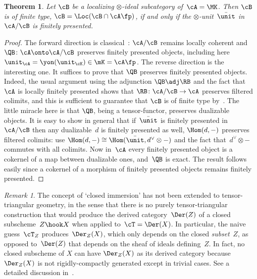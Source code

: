 \documentclass[11pt]{amsart}
\numberwithin{equation}{section} %
\theoremstyle{plain}
\newtheorem{thm}[equation]{Theorem}
\theoremstyle{definition}
\theoremstyle{remark}
\newtheorem{rem}[equation]{Remark}
\begin{document}
%
\begin{thm}
\label{thm:finite-type}%
Let $\cB$ be a localizing $\otimes$-ideal subcategory of~$\cA=\MK$. Then $\cB$ is of finite type, \ie $\cB=\Loc(\cB \cap \cA\fp)$, if and only if the $\otimes$-unit~$\bar\unit$ in~$\cA/\cB$ is finitely presented.
\end{thm}
%
\begin{proof}
The forward direction is classical~\cite[Theorem~2.6]{Krause97}: $\cA/\cB$ remains locally coherent and~$\QB\colon \cA\onto \cA/\cB$ preserves finitely presented objects, including here~$\unit_{\cA}=\yon(\unit_{\cK})\in\mK=\cA\fp$.
The reverse direction is the interesting one. It suffices to prove that $\QB$ preserves finitely presented objects. Indeed, the usual argument using the adjunction $\QB\adj \RB$ and the fact that $\cA$ is locally finitely presented shows that $\RB\colon \cA/\cB\to \cA$ preserves filtered colimits, and this is sufficient to guarantee that $\cB$ is of finite type by~\cite[Lemma~2.4]{Krause97}. The little miracle here is that $\QB$, being a tensor-functor, preserves dualizable objects. It is easy to show in general that if~$\bar\unit$ is finitely presented in~$\cA/\cB$ then any dualizable~$d$ is finitely presented as well, \ie $\Hom(d,-)$ preserves filtered colimits: use $\Hom(d,-)\cong\Hom(\bar\unit,d^\vee\otimes-)$ and  the fact that~$d^\vee\otimes-$ commutes with all colimits. Now in~$\cA$ every finitely presented object is a cokernel of a map between dualizable ones, and~$\QB$ is exact. The result follows easily since a cokernel of a morphism of finitely presented objects remains finitely presented.
\end{proof}

%
\begin{rem}
\label{rem:not-T_Z}%
The concept of `closed immersion' has not been extended to tensor-triangular geometry, in the sense that there is no purely tensor-triangular construction that would produce the derived category~$\Der(Z)$ of a closed subscheme~$Z\hook X$ when applied to~$\cT=\Der(X)$. In particular, the naive guess~$\cT_Z$ produces~$\Der_Z(X)$, which only depends on the closed \emph{subset}~$Z$, as opposed to~$\Der(Z)$ that depends on the sheaf of ideals defining~$Z$. In fact, no closed subscheme of $X$ can have $\Der_Z(X)$ as its derived category because $\Der_Z(X)$ is not rigidly-compactly generated except in trivial cases. See a detailed discussion in~\cite[Remark~2.12]{BalmerSanders25}.
\end{rem}
\end{document}
